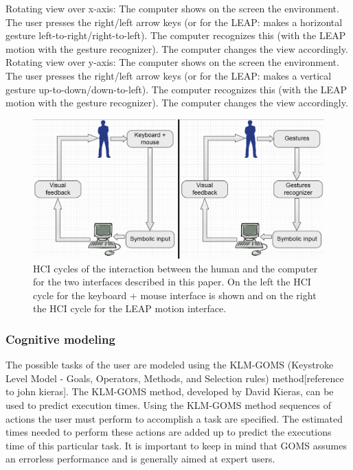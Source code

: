 \newline\newline
Rotating view over x-axis: 
\newline The computer shows on the screen the environment. The user presses the right/left arrow keys (or for the LEAP: makes a horizontal gesture left-to-right/right-to-left). The computer recognizes this (with the LEAP motion with the gesture recognizer). The computer changes the view accordingly.
\newline\newline
Rotating view over y-axis: 
\newline The computer shows on the screen the environment. The user presses the right/left arrow keys (or for the LEAP: makes a vertical gesture up-to-down/down-to-left). The computer recognizes this (with the LEAP motion with the gesture recognizer). The computer changes the view accordingly.

\begin{figure}
\includegraphics[width=\textwidth]{imgs/HCIcycles.png}
\caption{HCI cycles of the interaction between the human and the computer for the two interfaces described in this paper. On the left the HCI cycle for the keyboard + mouse interface is shown and on the right the HCI cycle for the LEAP motion interface.}
\label{fig:HCIcyles}
\end{figure}

\subsubsection{Cognitive modeling}
The possible tasks of the user are modeled using the KLM-GOMS (Keystroke Level Model - Goals, Operators, Methods, and Selection rules) method[reference to john kieras]. The KLM-GOMS method, developed by David Kieras, can be used to predict execution times. Using the KLM-GOMS method sequences of actions the user must perform to accomplish a task are specified. The estimated times needed to perform these actions are added up to predict the executions time of this particular task. It is important to keep in mind that GOMS assumes an errorless performance and is generally aimed at expert users.

